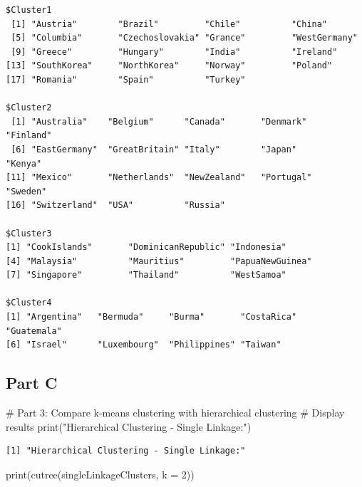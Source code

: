 \documentclass[
  letterpaper,
  DIV=11,
  numbers=noendperiod]{scrartcl}
\newenvironment{Shaded}{}{}
\newcommand{\AttributeTok}[1]{\textcolor[rgb]{0.84,0.60,0.13}{#1}}
\newcommand{\CommentTok}[1]{\textcolor[rgb]{0.57,0.51,0.45}{#1}}
\newcommand{\DecValTok}[1]{\textcolor[rgb]{0.96,0.45,0.00}{#1}}
\newcommand{\FunctionTok}[1]{\textcolor[rgb]{0.41,0.62,0.42}{#1}}
\newcommand{\NormalTok}[1]{\textcolor[rgb]{0.24,0.22,0.21}{#1}}
\newcommand{\StringTok}[1]{\textcolor[rgb]{0.60,0.59,0.10}{#1}}
\begin{document}
\begin{verbatim}
$Cluster1
 [1] "Austria"        "Brazil"         "Chile"          "China"         
 [5] "Columbia"       "Czechoslovakia" "Grance"         "WestGermany"   
 [9] "Greece"         "Hungary"        "India"          "Ireland"       
[13] "SouthKorea"     "NorthKorea"     "Norway"         "Poland"        
[17] "Romania"        "Spain"          "Turkey"        

$Cluster2
 [1] "Australia"    "Belgium"      "Canada"       "Denmark"      "Finland"     
 [6] "EastGermany"  "GreatBritain" "Italy"        "Japan"        "Kenya"       
[11] "Mexico"       "Netherlands"  "NewZealand"   "Portugal"     "Sweden"      
[16] "Switzerland"  "USA"          "Russia"      

$Cluster3
[1] "CookIslands"       "DominicanRepublic" "Indonesia"        
[4] "Malaysia"          "Mauritius"         "PapuaNewGuinea"   
[7] "Singapore"         "Thailand"          "WestSamoa"        

$Cluster4
[1] "Argentina"   "Bermuda"     "Burma"       "CostaRica"   "Guatemala"  
[6] "Israel"      "Luxembourg"  "Philippines" "Taiwan"     
\end{verbatim}

\hypertarget{part-c}{%
\subsection{Part C}\label{part-c}}

\begin{Shaded}
\begin{Highlighting}[]
\CommentTok{\# Part 3: Compare k{-}means clustering with hierarchical clustering}
\CommentTok{\# Display results}
\FunctionTok{print}\NormalTok{(}\StringTok{"Hierarchical Clustering {-} Single Linkage:"}\NormalTok{)}
\end{Highlighting}
\end{Shaded}

\begin{verbatim}
[1] "Hierarchical Clustering - Single Linkage:"
\end{verbatim}

\begin{Shaded}
\begin{Highlighting}[]
\FunctionTok{print}\NormalTok{(}\FunctionTok{cutree}\NormalTok{(singleLinkageClusters, }\AttributeTok{k =} \DecValTok{2}\NormalTok{))}
\end{Highlighting}
\end{Shaded}
\end{document}
